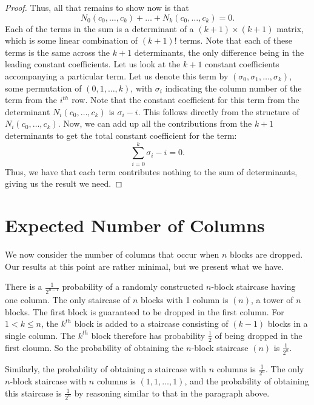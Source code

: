 \documentclass[12pt]{amsart}
\newcommand{\N}{N}
\newcommand{\newsection}[2]{
\section{#1 \label{#2}}
}
\begin{document}
\begin{proof}
Thus, all that remains to show now is that
$$
\N_0(c_0,\dots,c_k) + \dots + \N_k(c_0,\dots,c_k) = 0.
$$
Each of the terms in the sum is a determinant of a $(k+1)\times(k+1)$ matrix, which is some linear combination of $(k+1)!$ terms. Note that each of these terms is the same across the $k+1$ determinants, the only difference being in the leading constant coefficients. Let us look at the $k+1$ constant coefficients accompanying a particular term. Let us denote this term by $(\sigma_0, \sigma_1, \dots, \sigma_k)$, some permutation of $(0, 1, \dots, k)$, with $\sigma_i$ indicating the column number of the term from the $i^{th}$ row. Note that the constant coefficient for this term from the determinant $\N_i(c_0,\dots,c_k)$ is $\sigma_i - i$. This follows directly from the structure of $\N_i(c_0,\dots,c_k)$. Now, we can add up all the contributions from the $k+1$ determinants to get the total constant coefficient for the term:
$$
\sum_{i=0}^{k}{\sigma_i-i} = 0.
$$
Thus, we have that each term contributes nothing to the sum of determinants, giving us the result we need.

\end{proof}

\newsection{Expected Number of Columns}{sec:expectedcolumns}
We now consider the number of columns that occur when $n$ blocks are dropped. Our results at this point are rather minimal, but we present what we have.

There is a $\frac{1}{2^{n-1}}$ probability of a randomly constructed $n$-block staircase having one column. The only staircase of $n$ blocks with 1 column is $(n)$, a tower of $n$ blocks. The first block is guaranteed to be dropped in the first column. For $1<k \leq n$, the $k^{th}$ block is added to a staircase consisting of $(k-1)$ blocks in a single column. The $k^{th}$ block therefore has probability $\frac{1}{2}$ of being dropped in the first cloumn. So the probability of obtaining the $n$-block staircase $(n)$ is $\frac{1}{2^n}$.

Similarly, the probability of obtaining a staircase with $n$ columns is $\frac{1}{2^{n}}$. The only $n$-block staircase with $n$ columns is $(1, 1, \ldots, 1)$, and the probability of obtaining this staircase is $\frac{1}{2^{n}}$ by reasoning similar to that in the paragraph above.
\end{document}
